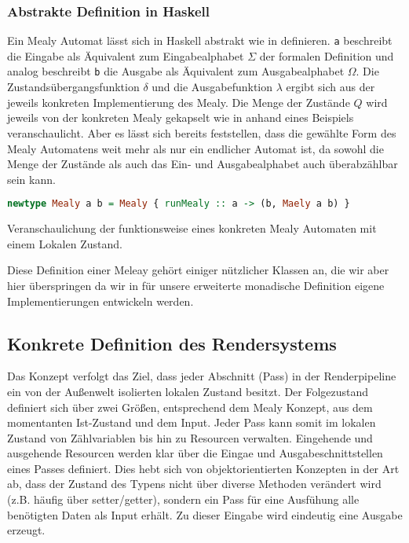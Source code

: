 \subsubsection{Abstrakte Definition in Haskell}

Ein Mealy Automat lässt sich in Haskell abstrakt wie in  definieren. {\tt a} beschreibt die Eingabe als Äquivalent zum Eingabealphabet $\Sigma$ der formalen Definition und analog beschreibt {\tt b} die Ausgabe als Äquivalent zum Ausgabealphabet $\Omega$. Die Zustandsübergangsfunktion $\delta$ und die Ausgabefunktion $\lambda$ ergibt sich aus der jeweils konkreten Implementierung des Mealy. Die Menge der Zustände $Q$ wird jeweils von der konkreten Mealy gekapselt wie in  anhand eines Beispiels veranschaulicht. Aber es lässt sich bereits feststellen, dass die gewählte Form des Mealy Automatens weit mehr als nur ein endlicher Automat ist, da sowohl die Menge der Zustände als auch das Ein- und Ausgabealphabet auch überabzählbar sein kann.

\begin{lstlisting}[language=Haskell,label={lst:haskell-mealy},caption={Definition Mealy in Haskell\protect\footnotemark},float]
newtype Mealy a b = Mealy { runMealy :: a -> (b, Maely a b) }
\end{lstlisting}

Veranschaulichung der funktionsweise eines konkreten Mealy Automaten mit einem Lokalen Zustand.

Diese Definition einer Meleay gehört einiger nützlicher Klassen an, die wir aber hier überspringen da wir in  für unsere erweiterte monadische Definition eigene Implementierungen entwickeln werden.

\subsection{Konkrete Definition des Rendersystems}
\label{sec:konkret-rendersystem}

Das Konzept verfolgt das Ziel, dass jeder Abschnitt (Pass) in der Renderpipeline ein von der Außenwelt isolierten lokalen Zustand besitzt. Der Folgezustand definiert sich über zwei Größen, entsprechend dem Mealy Konzept, aus dem momentanten Ist-Zustand und dem Input. Jeder Pass kann somit im lokalen Zustand von Zählvariablen bis hin zu Resourcen verwalten. Eingehende und ausgehende Resourcen werden klar über die Eingae und Ausgabeschnittstellen eines Passes definiert. Dies hebt sich von objektorientierten Konzepten in der Art ab, dass der Zustand des Typens nicht über diverse Methoden verändert wird (z.B. häufig über setter/getter), sondern ein Pass für eine Ausfühung alle benötigten Daten als Input erhält. Zu dieser Eingabe wird eindeutig eine Ausgabe erzeugt.

